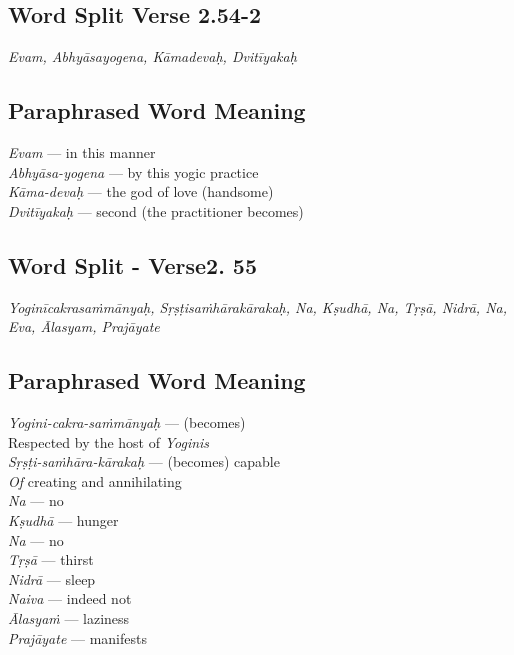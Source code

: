 \subsection*{Word Split Verse 2.54-2}


\textit{Evam, Abhyāsayogena, Kāmadevaḥ, Dvitīyakaḥ}

\subsection*{Paraphrased Word Meaning}

\begin{multicols}{2}
\textit{Evam }--- in this manner\\
\textit{Abhyāsa-yogena} --- by this yogic practice \\
\textit{Kāma-devaḥ} --- the god of love (handsome)\\
\textit{Dvitīyakaḥ }--- second (the practitioner becomes)
\end{multicols}

\subsection*{Word Split - Verse2. 55}


\textit{Yoginīcakrasaṁmānyaḥ, Sṛṣṭisaṁhārakārakaḥ, Na, Kṣudhā, Na, Tṛṣā, Nidrā, Na, Eva, Ālasyam, Prajāyate}

\subsection*{Paraphrased Word Meaning}


\begin{multicols}{2}
\textit{Yogini-cakra-saṁmānyaḥ} --- (becomes)\\
Respected by the host of \textit{Yoginis} \\
\textit{Sṛṣṭi-saṁhāra-kārakaḥ} --- (becomes) capable\\
\textit{Of} creating and annihilating  \\
\textit{Na} --- no \\
\textit{Kṣudhā} --- hunger \\
\textit{Na} --- no\\
\textit{Tṛṣā} --- thirst \\
\textit{Nidrā} --- sleep \\
\textit{Naiva} --- indeed not \\
\textit{Ālasyaṁ} --- laziness \\
\textit{Prajāyate} --- manifests 
\end{multicols}


